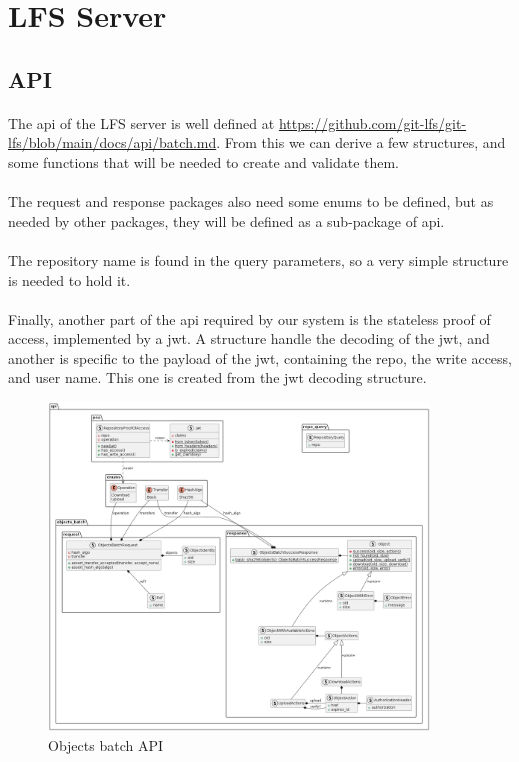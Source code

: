 \section{LFS Server}

\subsection{API}

\paragraph{}
The api of the LFS server is well defined at \url{https://github.com/git-lfs/git-lfs/blob/main/docs/api/batch.md}. From this we can derive a few structures, and some functions that will be needed to create and validate them. 

\paragraph{}
The request and response packages also need some enums to be defined, but as needed by other packages, they will be defined as a sub-package of api. 

\paragraph{}
The repository name is found in the query parameters, so a very simple structure is needed to hold it.

\paragraph{}
Finally, another part of the api required by our system is the stateless proof of access, implemented by a jwt. A structure handle the decoding of the jwt, and another is specific to the payload of the jwt, containing the repo, the write access, and user name. This one is created from the jwt decoding structure.

\begin{figure}[H]
    \centering
    \includegraphics[width=0.9\textwidth]{prototyping/diagrams/batch_api_structure.png}
    \caption{Objects batch  API}
    \label{fig:lfs_server_api}
\end{figure}

